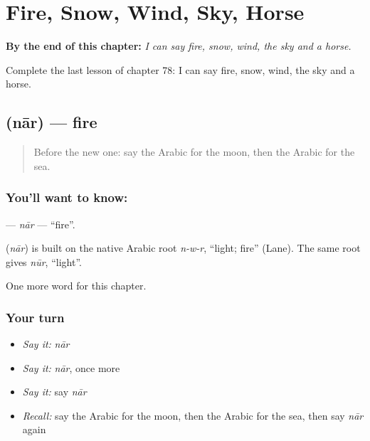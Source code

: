 
\chapter{Fire, Snow, Wind, Sky, Horse}
\label{ch:ar-fire-snow-wind-sky-horse}

\begin{chapteropening}
\textbf{By the end of this chapter:} \emph{I can say fire, snow, wind, the sky and a horse.}

Complete the last lesson of chapter 78: I can say fire, snow, wind, the sky and a horse.
\end{chapteropening}

\section[\texorpdfstring{\ar{نار} (nār)}{نار (nār)}]{ (nār) — fire}

\label{lesson:AR-C78-nar}



\begin{quote}
Before the new one: say the Arabic for the moon, then the Arabic for the sea.
\end{quote}

\subsection*{You'll want to know: }
\textbf{} — \emph{nār} — \textquotedblleft{}fire\textquotedblright{}.

\begin{cousinweb}
\textbf{} (\emph{nār}) is built on the native Arabic root \emph{n-w-r}, \textquotedblleft{}light; fire\textquotedblright{} (Lane). The same root gives \emph{nūr}, \textquotedblleft{}light\textquotedblright{}.
\end{cousinweb}

\begin{grammarlens}[title={What you've built}]
One more word for this chapter.
\end{grammarlens}

\subsection*{Your turn}
\begin{itemize}
\raggedright
  \item \emph{Say it:} \emph{nār}
  \item \emph{Say it:} \emph{nār}, once more
  \item \emph{Say it:} say \emph{nār}
  \item \emph{Recall:} say the Arabic for the moon, then the Arabic for the sea, then say \emph{nār} again
\end{itemize}

